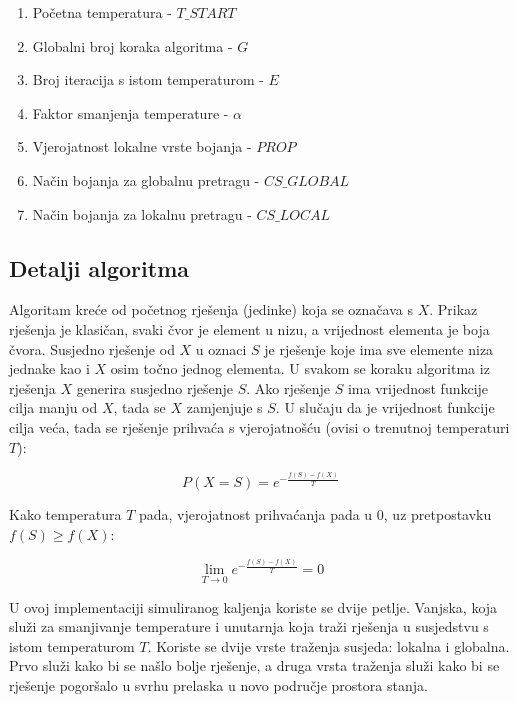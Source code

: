 \documentclass[times, utf8, diplomski, numeric]{fer}
\begin{document}
\begin{enumerate}
	\item Početna temperatura - $T\_START$
	\item Globalni broj koraka algoritma - $G$
	\item Broj iteracija s istom temperaturom - $E$
	\item Faktor smanjenja temperature - $\alpha$
	\item Vjerojatnost lokalne vrste bojanja - $PROP$
	\item Način bojanja za globalnu pretragu - $CS\_GLOBAL$
	\item Način bojanja za lokalnu pretragu - $CS\_LOCAL$
\end{enumerate}

\subsection{Detalji algoritma}

Algoritam kreće od početnog rješenja (jedinke) koja se označava s $X$. Prikaz rješenja je klasičan, svaki čvor je element u nizu, a vrijednost  elementa je boja čvora. Susjedno rješenje od $X$ u oznaci $S$ je rješenje koje ima sve elemente niza jednake kao i $X$ osim točno jednog elementa. U svakom se koraku algoritma iz rješenja $X$ generira susjedno rješenje $S$. Ako rješenje $S$ ima vrijednost funkcije cilja manju od $X$, tada se $X$ zamjenjuje s $S$. U slučaju da je vrijednost funkcije cilja veća, tada se rješenje prihvaća s vjerojatnošću (ovisi o trenutnoj temperaturi $T$):
 
\begin{equation}
	P(X=S) = e^{-\frac{f(S)-f(X)}{T}}
\end{equation}

Kako temperatura $T$ pada, vjerojatnost prihvaćanja pada u $0$, uz pretpostavku $f(S)\ge f(X)$:

\begin{equation}
	\lim_{T\rightarrow 0 } e^{-\frac{f(S)-f(X)}{T}} = 0	
\end{equation}

U ovoj implementaciji simuliranog kaljenja koriste se dvije petlje. Vanjska, koja služi za smanjivanje temperature i unutarnja koja traži rješenja u susjedstvu s istom temperaturom $T$. Koriste se dvije vrste traženja susjeda: lokalna i globalna. Prvo služi kako bi se našlo bolje rješenje, a druga vrsta traženja služi kako bi se rješenje pogoršalo u svrhu prelaska u novo područje prostora stanja. 
\end{document}
